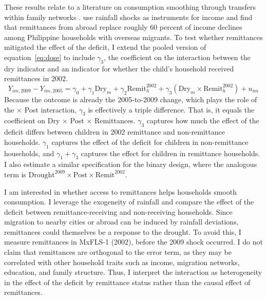 \documentclass[12pt]{article}
\begin{document}
These results relate to a literature on consumption smoothing through transfers within family networks \parencite{rosenzweigRiskImplicitContracts1988,rosenzweigConsumptionSmoothingMigration1989,yangAreRemittancesInsurance2007,yangCopingDisasterImpact2008,yangMigrantRemittances2011}. \textcite{yangAreRemittancesInsurance2007} use rainfall shocks as instruments for income and find that remittances from abroad replace roughly 60 percent of income declines among Philippine households with overseas migrants. To test whether remittances mitigated the effect of the deficit, I extend the pooled version of equation~\eqref{eq:dose} to include $\gamma_3$, the coefficient on the interaction between the dry indicator and an indicator for whether the child's household received remittances in 2002.
\begin{equation}
Y_{im,2009} - Y_{im,2005} = \gamma_0 + \gamma_1 \text{Dry}_m + \gamma_2 \text{Remit}_h^{2002} + \gamma_3 \left(\text{Dry}_m \times \text{Remit}_h^{2002}\right) + u_{im} \label{eq:remit}
\end{equation}
Because the outcome is already the 2005-to-2009 change, which plays the role of the $\times$ Post interaction, $\gamma_3$ is effectively a triple difference. That is, it equals the coefficient on Dry $\times$ Post $\times$ Remittances. $\gamma_3$ captures how much the effect of the deficit differs between children in 2002 remittance and non-remittance households. $\gamma_1$ captures the effect of the deficit for children in non-remittance households, and $\gamma_1 + \gamma_3$ captures the effect for children in remittance households. I also estimate a similar specification for the binary design, where the analogous term is $\text{Drought}^{2009} \times \text{Post} \times \text{Remit}^{2002}$.

I am interested in whether access to remittances helps households smooth consumption. I leverage the exogeneity of rainfall and compare the effect of the deficit between remittance-receiving and non-receiving households. Since migration to nearby cities or abroad can be induced by rainfall deviations, remittances could themselves be a response to the drought. To avoid this, I measure remittances in MxFLS-1 (2002), before the 2009 shock occurred. I do not claim that remittances are orthogonal to the error term, as they may be correlated with other household traits such as income, migration networks, education, and family structure. Thus, I interpret the interaction as heterogeneity in the effect of the deficit by remittance status rather than the causal effect of remittances.
\end{document}
